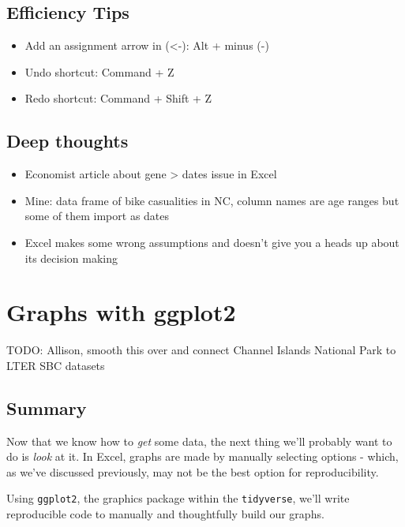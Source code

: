 \documentclass[]{book}
\providecommand{\tightlist}{%
  \setlength{\itemsep}{0pt}\setlength{\parskip}{0pt}}
\begin{document}
\hypertarget{efficiency-tips-3}{%
\section{Efficiency Tips}\label{efficiency-tips-3}}

\begin{itemize}
\tightlist
\item
  Add an assignment arrow in (\textless{}-): Alt + minus (-)
\item
  Undo shortcut: Command + Z
\item
  Redo shortcut: Command + Shift + Z
\end{itemize}

\hypertarget{deep-thoughts-1}{%
\section{Deep thoughts}\label{deep-thoughts-1}}

\begin{itemize}
\tightlist
\item
  Economist article about gene \textgreater{} dates issue in Excel
\item
  Mine: data frame of bike casualities in NC, column names are age ranges but some of them import as dates
\item
  Excel makes some wrong assumptions and doesn't give you a heads up about its decision making
\end{itemize}

\hypertarget{ggplot2}{%
\chapter{Graphs with ggplot2}\label{ggplot2}}

TODO: Allison, smooth this over and connect Channel Islands National Park to LTER SBC datasets

\hypertarget{summary-3}{%
\section{Summary}\label{summary-3}}

Now that we know how to \emph{get} some data, the next thing we'll probably want to do is \emph{look} at it. In Excel, graphs are made by manually selecting options - which, as we've discussed previously, may not be the best option for reproducibility.

Using \texttt{ggplot2}, the graphics package within the \texttt{tidyverse}, we'll write reproducible code to manually and thoughtfully build our graphs.
\end{document}
